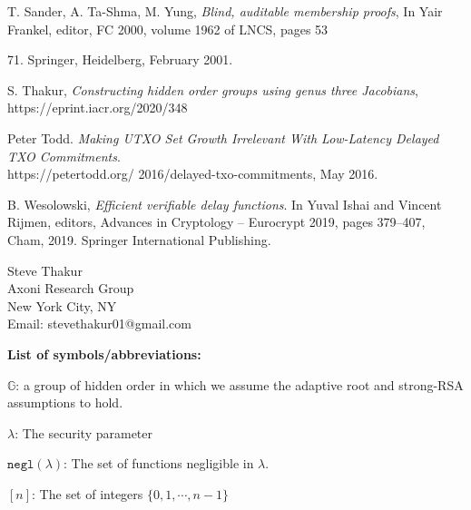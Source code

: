 \documentclass[11pt, lettersize, notitlepage, leqno, footskip=0.6cm]{article}
\newcommand{\ttt}{\texttt}
\newcommand{\negl}{\ttt{{negl}}}
\newcommand{\mb}{\mathbb}
\newcommand{\lam}{\lambda}
\newcommand{\noin}{\noindent}
\numberwithin{equation}{section}
\begin{document}
\noindent [STY01] T. Sander, A. Ta-Shma, M. Yung, \textit{Blind, auditable membership proofs}, In Yair Frankel, editor, FC 2000, volume 1962 of LNCS, pages 53{71. Springer, Heidelberg, February 2001.\vspace{0.1cm}


\noindent [Th20] S. Thakur, \textit{Constructing hidden order groups using genus three Jacobians}, https://eprint.iacr.org/2020/348\vspace{0.1cm} 

\noin [Tod16] Peter Todd. \textit{Making UTXO Set Growth Irrelevant With Low-Latency Delayed TXO Commitments}.\\ https://petertodd.org/
2016/delayed-txo-commitments, May 2016.\vspace{0.1cm}

\noindent [Wes19] B. Wesolowski, \textit{Efficient verifiable delay functions}. In Yuval Ishai and Vincent Rijmen, editors, Advances in Cryptology – Eurocrypt 2019, pages 379–407, Cham, 2019. Springer International Publishing.\vspace{0.1cm}




\bigskip

\normalsize
\noindent Steve Thakur\\
Axoni Research Group\\
New York City, NY\\
Email: stevethakur01@gmail.com


\newpage


\begin{center}\textbf{List of symbols/abbreviations:}\end{center}

\noindent $\mb{G}$: a group of hidden order in which we assume the adaptive root and strong-RSA assumptions to hold. \vspace{0.1cm}

\noindent $\lam$: The security parameter \vspace{0.1cm}

\noindent $\negl(\lam)$: The set of functions negligible in $\lam$. \vspace{0.1cm}

\noindent $[n]$: The set of integers $\{0,1,\cdots,n-1 \}$ \vspace{0.1cm}

}
\end{document}
